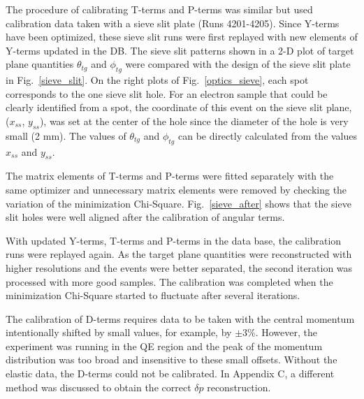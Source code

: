 The procedure of calibrating T-terms and P-terms was similar but used calibration data taken with a sieve slit plate (Runs 4201-4205). Since Y-terms have been optimized, these sieve slit runs were first replayed with new elements of Y-terms updated in the DB. The sieve slit patterns shown in a 2-D plot of target plane quantities $\theta_{tg}$ and $\phi_{tg}$ were compared with the design of the sieve slit plate in Fig.~\ref{sieve_slit}. On the right plots of Fig.~\ref{optics_sieve}, each spot corresponds to the one sieve slit hole. For an electron sample that could be clearly identified from a spot, the coordinate of this event on the sieve slit plane, ($x_{ss}$, $y_{ss}$), was set at the center of the hole since the diameter of the hole is very small (2 mm). The values of $\theta_{tg}$ and $\phi_{tg}$ can be directly calculated from the values $x_{ss}$ and $y_{ss}$.

 The matrix elements of T-terms and P-terms were fitted separately with the same optimizer and unnecessary matrix elements were removed by checking the variation of the minimization Chi-Square. Fig.~\ref{sieve_after} shows that the sieve slit holes were well aligned after the calibration of angular terms. 

 With updated Y-terms, T-terms and P-terms in the data base, the calibration runs were replayed again. As the target plane quantities were reconstructed with higher resolutions and the events were better separated, the second iteration was processed with more good samples. The calibration was completed when the minimization Chi-Square started to fluctuate after several iterations. 

 The calibration of D-terms requires data to be taken with the central momentum intentionally shifted by small values, for example, by $\mathrm{\pm 3\%}$. However, the experiment was running in the QE region and the peak of the momentum distribution was too broad and insensitive to these small offsets. Without the elastic data, the D-terms could not be calibrated. In Appendix C, a different method was discussed to obtain the correct $\delta p$ reconstruction.
